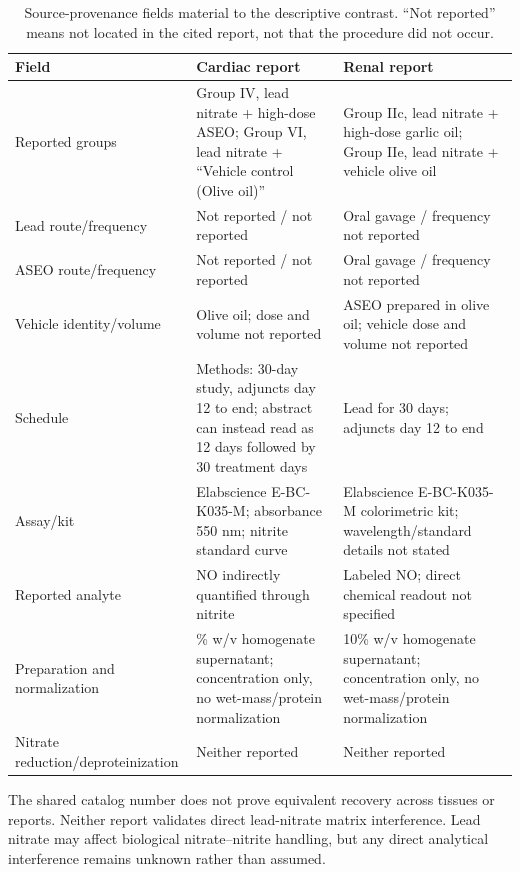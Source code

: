 \documentclass[11pt]{article}
\begin{document}
\begin{table}[htbp]
\centering
\caption{Source-provenance fields material to the descriptive contrast. ``Not reported'' means not located in the cited report, not that the procedure did not occur.}
\label{tab:provenance}
\scriptsize
\begin{tabularx}{\textwidth}{>{\raggedright\arraybackslash}p{}>{\raggedright\arraybackslash}p{}X}
\toprule
Field & Cardiac report & Renal report \\
\midrule
Reported groups & Group IV, lead nitrate + high-dose ASEO; Group VI, lead nitrate + ``Vehicle control (Olive oil)'' & Group IIc, lead nitrate + high-dose garlic oil; Group IIe, lead nitrate + vehicle olive oil \\
Lead route/frequency & Not reported / not reported & Oral gavage / frequency not reported \\
ASEO route/frequency & Not reported / not reported & Oral gavage / frequency not reported \\
Vehicle identity/volume & Olive oil; dose and volume not reported & ASEO prepared in olive oil; vehicle dose and volume not reported \\
Schedule & Methods: 30-day study, adjuncts day 12 to end; abstract can instead read as 12 days followed by 30 treatment days & Lead for 30 days; adjuncts day 12 to end \\
Assay/kit & Elabscience E-BC-K035-M; absorbance 550 nm; nitrite standard curve & Elabscience E-BC-K035-M colorimetric kit; wavelength/standard details not stated \\
Reported analyte & NO indirectly quantified through nitrite & Labeled NO; direct chemical readout not specified \\
Preparation and normalization & 10\% w/v homogenate supernatant; concentration only, no wet-mass/protein normalization & 10\% w/v homogenate supernatant; concentration only, no wet-mass/protein normalization \\
Nitrate reduction/deproteinization & Neither reported & Neither reported \\
\bottomrule
\end{tabularx}
\end{table}

The shared catalog number does not prove equivalent recovery across tissues or reports. Neither report validates direct lead-nitrate matrix interference. Lead nitrate may affect biological nitrate--nitrite handling, but any direct analytical interference remains unknown rather than assumed.
\end{document}
